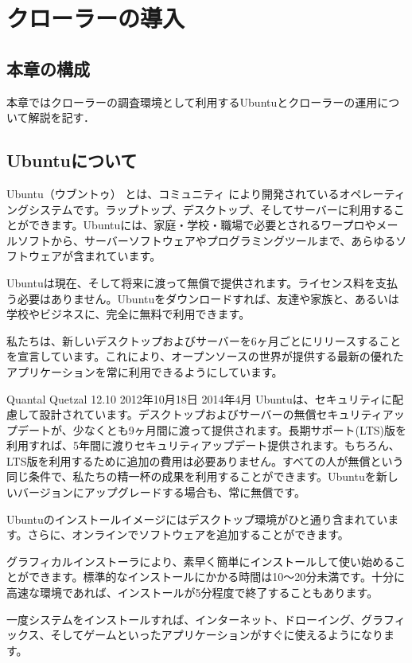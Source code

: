 \chapter{クローラーの導入}
\section{本章の構成}
本章ではクローラーの調査環境として利用するUbuntuとクローラーの運用について解説を記す．

\section{Ubuntuについて}
Ubuntu（ウブントゥ） とは、コミュニティ により開発されているオペレーティングシステムです。ラップトップ、デスクトップ、そしてサーバーに利用することができます。Ubuntuには、家庭・学校・職場で必要とされるワープロやメールソフトから、サーバーソフトウェアやプログラミングツールまで、あらゆるソフトウェアが含まれています。

Ubuntuは現在、そして将来に渡って無償で提供されます。ライセンス料を支払う必要はありません。Ubuntuをダウンロードすれば、友達や家族と、あるいは学校やビジネスに、完全に無料で利用できます。

私たちは、新しいデスクトップおよびサーバーを6ヶ月ごとにリリースすることを宣言しています。これにより、オープンソースの世界が提供する最新の優れたアプリケーションを常に利用できるようにしています。

Quantal Quetzal 12.10 2012年10月18日 2014年4月
Ubuntuは、セキュリティに配慮して設計されています。デスクトップおよびサーバーの無償セキュリティアップデートが、少なくとも9ヶ月間に渡って提供されます。長期サポート(LTS)版を利用すれば、5年間に渡りセキュリティアップデート提供されます。もちろん、LTS版を利用するために追加の費用は必要ありません。すべての人が無償という同じ条件で、私たちの精一杯の成果を利用することができます。Ubuntuを新しいバージョンにアップグレードする場合も、常に無償です。

Ubuntuのインストールイメージにはデスクトップ環境がひと通り含まれています。さらに、オンラインでソフトウェアを追加することができます。

グラフィカルインストーラにより、素早く簡単にインストールして使い始めることができます。標準的なインストールにかかる時間は10〜20分未満です。十分に高速な環境であれば、インストールが5分程度で終了することもあります。

一度システムをインストールすれば、インターネット、ドローイング、グラフィックス、そしてゲームといったアプリケーションがすぐに使えるようになります。

